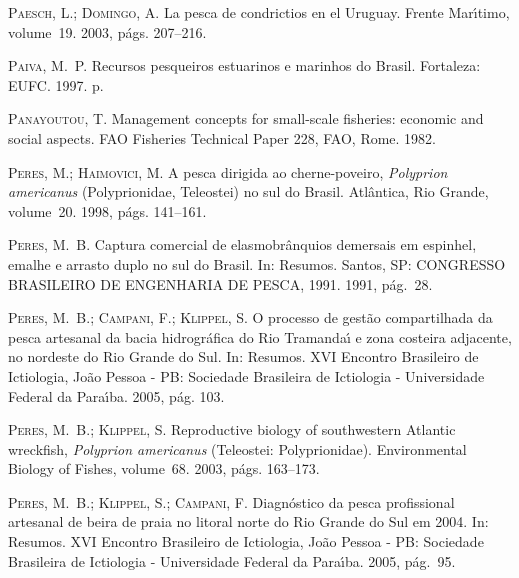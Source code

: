 \documentclass[a4paper,11pt,twoside,showtrims,onecolumn,openright,final]{memoir}
\begin{document}
\begin{thebibliography}{194}
\textsc{Paesch, L.; Domingo, A.}
\newblock La pesca de condrictios en el {U}ruguay.
\newblock Frente Mar\'{\i}timo, volume~19. 2003, p\'ags. 207--216.

\textsc{Paiva, M.~P.}
\newblock Recursos pesqueiros estuarinos e marinhos do {B}rasil.
\newblock Fortaleza: EUFC. 1997.
 p.

\textsc{Panayoutou, T.}
\newblock Management concepts for small-scale fisheries: economic and social
  aspects.
\newblock FAO Fisheries Technical Paper 228, FAO, Rome. 1982.

\textsc{Peres, M.; Haimovici, M.}
\newblock A pesca dirigida ao cherne-poveiro, \emph{{P}olyprion americanus}
  ({P}olyprionidae, {T}eleostei) no sul do {B}rasil.
\newblock Atl\^antica, Rio Grande, volume~20. 1998, p\'ags. 141--161.

\textsc{Peres, M.~B.}
\newblock Captura comercial de elasmobr\^anquios demersais em espinhel, emalhe
  e arrasto duplo no sul do {B}rasil.
\newblock In: Resumos. Santos, SP: CONGRESSO BRASILEIRO DE ENGENHARIA DE PESCA,
  1991. 1991, p\'ag.~28.

\textsc{Peres, M.~B.; Campani, F.; Klippel, S.}
\newblock O processo de gest\~ao compartilhada da pesca artesanal da bacia
  hidrogr\'afica do {R}io {T}ramanda\'{\i} e zona costeira adjacente, no
  nordeste do {R}io {G}rande do {S}ul.
\newblock In: Resumos. XVI Encontro Brasileiro de Ictiologia, Jo\~ao Pessoa -
  PB: Sociedade Brasileira de Ictiologia - Universidade Federal da
  Para\'{\i}ba. 2005{}, p\'ag. 103.

\textsc{Peres, M.~B.; Klippel, S.}
\newblock Reproductive biology of southwestern {A}tlantic wreckfish,
  \emph{{P}olyprion americanus} ({T}eleostei: {P}olyprionidae).
\newblock Environmental Biology of Fishes, volume~68. 2003, p\'ags. 163--173.

\textsc{Peres, M.~B.; Klippel, S.; Campani, F.}
\newblock Diagn\'ostico da pesca profissional artesanal de beira de praia no
  litoral norte do {R}io {G}rande do {S}ul em 2004.
\newblock In: Resumos. XVI Encontro Brasileiro de Ictiologia, Jo\~ao Pessoa -
  PB: Sociedade Brasileira de Ictiologia - Universidade Federal da
  Para\'{\i}ba. 2005{}, p\'ag.~95.


\end{thebibliography}
\end{document}
